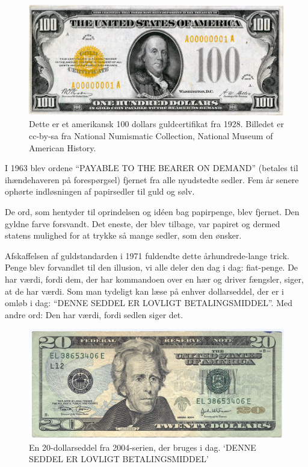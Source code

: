 \documentclass[paper=6in:9in,pagesize=pdftex,headinclude=on,footinclude=on,12pt]{scrbook}
\begin{document}
\begin{figure}
  \centering
  \includegraphics{assets/images/us-gold-cert-100-smaller.png}
  \caption{Dette er et amerikansk 100 dollars guldcertifikat fra 1928. Billedet er cc-by-sa fra National Numismatic Collection, National Museum of American History.}
  \label{fig:us-gold-cert-100-smaller}
\end{figure}

I 1963 blev ordene \enquote{PAYABLE TO THE BEARER ON DEMAND} (betales til ihændehaveren på forespørgsel) fjernet fra alle nyudstedte sedler. Fem år senere ophørte indløsningen af papirsedler til guld og sølv.

De ord, som hentyder til oprindelsen og id\'een bag papirpenge, blev fjernet. Den gyldne farve forsvandt. Det eneste, der blev tilbage, var papiret og dermed statens mulighed for at trykke så mange sedler, som den ønsker.

Afskaffelsen af guldstandarden i 1971 fuldendte dette århundrede-lange trick. Penge blev forvandlet til den illusion, vi alle deler den dag i dag: fiat-penge. De har værdi, fordi dem, der har kommandoen over en hær og driver fængsler, siger, at de har værdi. Som man tydeligt kan læse på enhver dollarseddel, der er i omløb i dag: \enquote{DENNE SEDDEL ER LOVLIGT BETALINGSMIDDEL}. Med andre ord: Den har værdi, fordi sedlen siger det.\begin{figure}
  \centering
  \includegraphics{assets/images/us-dollar-2004.jpg}
  \caption{En 20-dollarseddel fra 2004-serien, der bruges i dag. `DENNE SEDDEL ER LOVLIGT BETALINGSMIDDEL'}
  \label{fig:us-dollar-2004}
\end{figure}
\end{document}
